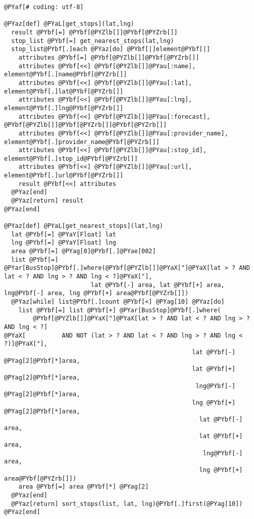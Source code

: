 \begin{Verbatim}[commandchars=@\[\]]
@PYaf[# coding: utf-8]

@PYaz[def] @PYaL[get_stops](lat,lng)
  result @PYbf[=] @PYbf[@PYZlb[]]@PYbf[@PYZrb[]]
  stop_list @PYbf[=] get_nearest_stops(lat,lng)
  stop_list@PYbf[.]each @PYaz[do] @PYbf[|]element@PYbf[|]
    attributes @PYbf[=] @PYbf[@PYZlb[]]@PYbf[@PYZrb[]]
    attributes @PYbf[<<] @PYbf[@PYZlb[]]@PYau[:name], element@PYbf[.]name@PYbf[@PYZrb[]]
    attributes @PYbf[<<] @PYbf[@PYZlb[]]@PYau[:lat], element@PYbf[.]lat@PYbf[@PYZrb[]]
    attributes @PYbf[<<] @PYbf[@PYZlb[]]@PYau[:lng], element@PYbf[.]lng@PYbf[@PYZrb[]]
    attributes @PYbf[<<] @PYbf[@PYZlb[]]@PYau[:forecast], @PYbf[@PYZlb[]]@PYbf[@PYZrb[]]@PYbf[@PYZrb[]]
    attributes @PYbf[<<] @PYbf[@PYZlb[]]@PYau[:provider_name], element@PYbf[.]provider_name@PYbf[@PYZrb[]]
    attributes @PYbf[<<] @PYbf[@PYZlb[]]@PYau[:stop_id], element@PYbf[.]stop_id@PYbf[@PYZrb[]]
    attributes @PYbf[<<] @PYbf[@PYZlb[]]@PYau[:url], element@PYbf[.]url@PYbf[@PYZrb[]]
    result @PYbf[<<] attributes
  @PYaz[end]
  @PYaz[return] result
@PYaz[end]

@PYaz[def] @PYaL[get_nearest_stops](lat,lng)
  lat @PYbf[=] @PYaY[Float] lat
  lng @PYbf[=] @PYaY[Float] lng
  area @PYbf[=] @PYag[0]@PYbf[.]@PYae[002]
  list @PYbf[=] @PYar[BusStop]@PYbf[.]where(@PYbf[@PYZlb[]]@PYaX["]@PYaX[lat > ? AND lat < ? AND lng > ? AND lng < ?]@PYaX["],
                        lat @PYbf[-] area, lat @PYbf[+] area, lng@PYbf[-] area, lng @PYbf[+] area@PYbf[@PYZrb[]])
  @PYaz[while] list@PYbf[.]count @PYbf[<] @PYag[10] @PYaz[do]
    list @PYbf[=] list @PYbf[+] @PYar[BusStop]@PYbf[.]where(
        @PYbf[@PYZlb[]]@PYaX["]@PYaX[lat > ? AND lat < ? AND lng > ? AND lng < ?]
@PYaX[          AND NOT (lat > ? AND lat < ? AND lng > ? AND lng < ?)]@PYaX["],
                                                    lat @PYbf[-] @PYag[2]@PYbf[*]area,
                                                    lat @PYbf[+] @PYag[2]@PYbf[*]area,
                                                     lng@PYbf[-] @PYag[2]@PYbf[*]area,
                                                    lng @PYbf[+] @PYag[2]@PYbf[*]area,
                                                      lat @PYbf[-] area,
                                                      lat @PYbf[+] area,
                                                       lng@PYbf[-] area,
                                                      lng @PYbf[+] area@PYbf[@PYZrb[]])
    area @PYbf[=] area @PYbf[*] @PYag[2]
  @PYaz[end]
  @PYaz[return] sort_stops(list, lat, lng)@PYbf[.]first(@PYag[10])
@PYaz[end]


\end{Verbatim}
